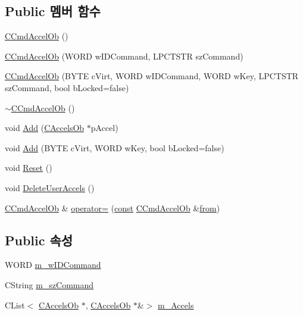 \subsection*{Public 멤버 함수}
\begin{DoxyCompactItemize}
\item 
\mbox{\hyperlink{class_c_cmd_accel_ob_a2f5bb136c7ba36c31551cec05f3c47fc}{C\+Cmd\+Accel\+Ob}} ()
\item 
\mbox{\hyperlink{class_c_cmd_accel_ob_a245369282fbad17c28924e0568fa5bcc}{C\+Cmd\+Accel\+Ob}} (W\+O\+RD w\+I\+D\+Command, L\+P\+C\+T\+S\+TR sz\+Command)
\item 
\mbox{\hyperlink{class_c_cmd_accel_ob_a2c532e999fa7dcb99d7d9b1027cebbef}{C\+Cmd\+Accel\+Ob}} (B\+Y\+TE c\+Virt, W\+O\+RD w\+I\+D\+Command, W\+O\+RD w\+Key, L\+P\+C\+T\+S\+TR sz\+Command, bool b\+Locked=false)
\item 
\mbox{\hyperlink{class_c_cmd_accel_ob_a41d00fee4f058c03fa85630612e1ab69}{$\sim$\+C\+Cmd\+Accel\+Ob}} ()
\item 
void \mbox{\hyperlink{class_c_cmd_accel_ob_a519f8c7ac935b0d06531589e5427b656}{Add}} (\mbox{\hyperlink{class_c_accels_ob}{C\+Accels\+Ob}} $\ast$p\+Accel)
\item 
void \mbox{\hyperlink{class_c_cmd_accel_ob_a15429015a20179a0e181347f35ad9c58}{Add}} (B\+Y\+TE c\+Virt, W\+O\+RD w\+Key, bool b\+Locked=false)
\item 
void \mbox{\hyperlink{class_c_cmd_accel_ob_ac679e57ed400b175109af50ea2ce919d}{Reset}} ()
\item 
void \mbox{\hyperlink{class_c_cmd_accel_ob_a7040471adc76f057a1d79c9fdfb84fe8}{Delete\+User\+Accels}} ()
\item 
\mbox{\hyperlink{class_c_cmd_accel_ob}{C\+Cmd\+Accel\+Ob}} \& \mbox{\hyperlink{class_c_cmd_accel_ob_a045ce00d2465fefed857066eef1406a7}{operator=}} (\mbox{\hyperlink{getopt1_8c_a2c212835823e3c54a8ab6d95c652660e}{const}} \mbox{\hyperlink{class_c_cmd_accel_ob}{C\+Cmd\+Accel\+Ob}} \&\mbox{\hyperlink{expr_8cpp_a765533dfc643627999c751f7e1514664}{from}})
\end{DoxyCompactItemize}
\subsection*{Public 속성}
\begin{DoxyCompactItemize}
\item 
W\+O\+RD \mbox{\hyperlink{class_c_cmd_accel_ob_aa3eb02dcd39ff14763fdefd8fabd7591}{m\+\_\+w\+I\+D\+Command}}
\item 
C\+String \mbox{\hyperlink{class_c_cmd_accel_ob_acbd02cc68d3909b1e39b687e76f45d91}{m\+\_\+sz\+Command}}
\item 
C\+List$<$ \mbox{\hyperlink{class_c_accels_ob}{C\+Accels\+Ob}} $\ast$, \mbox{\hyperlink{class_c_accels_ob}{C\+Accels\+Ob}} $\ast$\&$>$ \mbox{\hyperlink{class_c_cmd_accel_ob_a85772f1ea9204af42b8a39a0135dc0f8}{m\+\_\+\+Accels}}
\end{DoxyCompactItemize}


